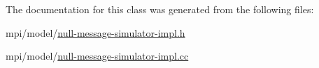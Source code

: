 The documentation for this class was generated from the following files\+:\begin{DoxyCompactItemize}
\item 
mpi/model/\hyperlink{null-message-simulator-impl_8h}{null-\/message-\/simulator-\/impl.\+h}\item 
mpi/model/\hyperlink{null-message-simulator-impl_8cc}{null-\/message-\/simulator-\/impl.\+cc}\end{DoxyCompactItemize}
